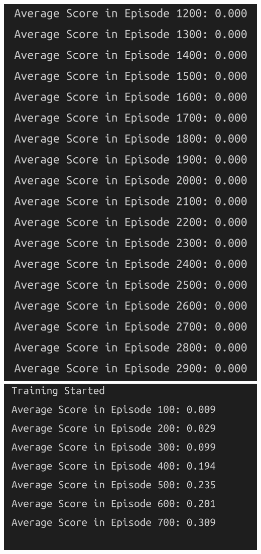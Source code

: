 \documentclass[
]{article}
\begin{document}
\pagebreak

\includegraphics{imgs/results_5.png}
\includegraphics{imgs/results_6.png}
\end{document}

